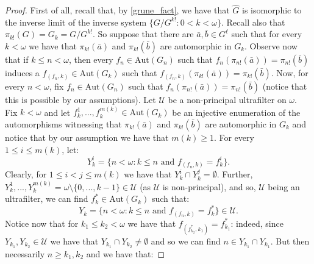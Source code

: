 \documentclass[a4paper, 11pt]{amsart}
\theoremstyle{definition}
\theoremstyle{remark}
\renewcommand{\leq}{\leqslant}
\renewcommand{\geq}{\geqslant}
\begin{document}
\begin{proof} First of all, recall that, by \ref{grune_fact}, we have that $\widehat{G}$ is isomorphic to the inverse limit of the inverse system $\{G/G^{k!} : 0 < k < \omega \}$. Recall also that $\pi_{k!}(G) = G_k = G/G^{k!}$. So suppose that there are $\bar{a}, \bar{b} \in G^\ell$ such that for every $k < \omega$ we have that $\pi_{k!}(\bar{a})$ and $\pi_{k!}(\bar{b})$ are automorphic in $G_k$.
%
Observe now that if $k \leq n < \omega$, then every $f_n \in \mathrm{Aut}(G_n)$ such that $f_n(\pi_{n!}(\bar{a})) = \pi_{n!}(\bar{b})$ induces a $f_{(f_n, k)} \in \mathrm{Aut}(G_k)$ such that $f_{(f_n, k)}(\pi_{k!}(\bar{a})) = \pi_{k!}(\bar{b})$. Now, for every $n < \omega$, fix $f_n \in \mathrm{Aut}(G_n)$ such that $f_n(\pi_{n!}(\bar{a})) = \pi_{n!}(\bar{b})$ (notice that this is possible by our assumptions). Let $\mathcal{U}$ be a non-principal ultrafilter on $\omega$. Fix $k < \omega$ and let $f^1_k, ..., f^{m(k)}_k \in \mathrm{Aut}(G_k)$ be an injective enumeration of the automorphisms witnessing that $\pi_{k!}(\bar{a})$ and $\pi_{k!}(\bar{b})$ are automorphic in $G_k$ and notice that by our assumption we  have that $m(k) \geq 1$. For every $1 \leq i \leq m(k)$, let:
$$Y^i_k = \{n < \omega : k \leq n \text{ and } f_{(f_n, k)} = f^i_k\}.$$
Clearly, for $1 \leq i < j \leq m(k)$ we have that $Y^i_k \cap Y^j_k = \emptyset$. Further,  $Y^1_k, ..., Y^{m(k)}_k = \omega \setminus \{0, ..., k-1\} \in \mathcal{U}$ (as $\mathcal{U}$ is non-principal), and so, $\mathcal{U}$ being an ultrafilter, we can find $f^*_k \in \mathrm{Aut}(G_k)$ such that:
$$Y_k = \{n < \omega : k \leq n \text{ and } f_{(f_n, k)} = f^*_k\} \in \mathcal{U}.$$
Notice now that for $k_1 \leq k_2 < \omega$ we have that $f_{(f^*_{k_2}, k_1)} = f^*_{k_1}$: indeed, since $Y_{k_1}, Y_{k_2} \in \mathcal{U}$ we have that $Y_{k_1} \cap Y_{k_2} \neq \emptyset$ and so we can find $n \in Y_{k_1} \cap Y_{k_1}$. But then necessarily $n \geq k_1, k_2$ and we have that: 

\end{proof}
\end{document}
